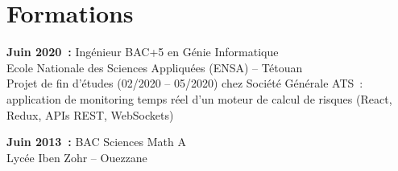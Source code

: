 \section*{Formations}

\noindent\textbf{Juin 2020~:} Ingénieur BAC+5 en Génie Informatique\\
Ecole Nationale des Sciences Appliquées (ENSA) -- Tétouan\\
Projet de fin d'études (02/2020 -- 05/2020) chez Société Générale ATS~: application de monitoring temps réel d'un moteur de calcul de risques (React, Redux, APIs REST, WebSockets)

\vspace{4pt}
\noindent\textbf{Juin 2013~:} BAC Sciences Math A\\
Lycée Iben Zohr -- Ouezzane
